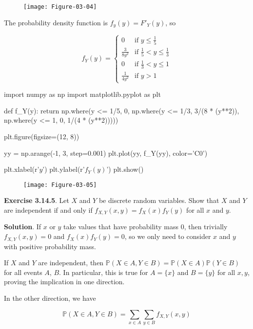 \begin{figure}[H]
\texttt{[image: Figure-03-04]}
\end{figure}

The probability density function is \(f_y(y) = F'_Y(y)\), so

\[ f_Y(y) = \begin{cases}
0  &\text{if } y \leq \frac{1}{5} \\
\frac{3}{8y^2} &\text{if } \frac{1}{5} < y \leq \frac{1}{3} \\
0 &\text{if } \frac{1}{3} < y \leq 1 \\
\frac{1}{4y^2} &\text{if } y > 1
\end{cases}\]

\begin{python}
import numpy as np
import matplotlib.pyplot as plt

def f_Y(y):
    return np.where(y <= 1/5, 0, np.where(y <= 1/3, 3/(8 * (y**2)), np.where(y <= 1, 0, 1/(4 * (y**2)))))

plt.figure(figsize=(12, 8))

yy = np.arange(-1, 3, step=0.001)
plt.plot(yy, f_Y(yy), color='C0')
    
plt.xlabel(r'$y$')
plt.ylabel(r'$f_Y(y)$')
plt.show()
\end{python}

\begin{figure}[H]
\texttt{[image: Figure-03-05]}
\end{figure}

\textbf{Exercise 3.14.5}. Let \(X\) and \(Y\) be discrete random
variables. Show that \(X\) and \(Y\) are independent if and only if
\(f_{X, Y}(x, y) = f_X(x) f_Y(y)\) for all \(x\) and \(y\).

\textbf{Solution}. If \(x\) or \(y\) take values that have probability
mass 0, then trivially \(f_{X, Y}(x, y) = 0\) and \(f_X(x) f_Y(y) = 0\),
so we only need to consider \(x\) and \(y\) with positive probability
mass.

If \(X\) and \(Y\) are independent, then
\(\mathbb{P}(X \in A, Y \in B) = \mathbb{P}(X \in A)\mathbb{P}(Y \in B)\)
for all events \(A\), \(B\). In particular, this is true for
\(A = \{x\}\) and \(B = \{ y \}\) for all \(x, y\), proving the
implication in one direction.

In the other direction, we have

\[ \mathbb{P}(X \in A, Y \in B) = \sum_{x \in A} \sum_{y \in B} f_{X, Y}(x, y) \]


